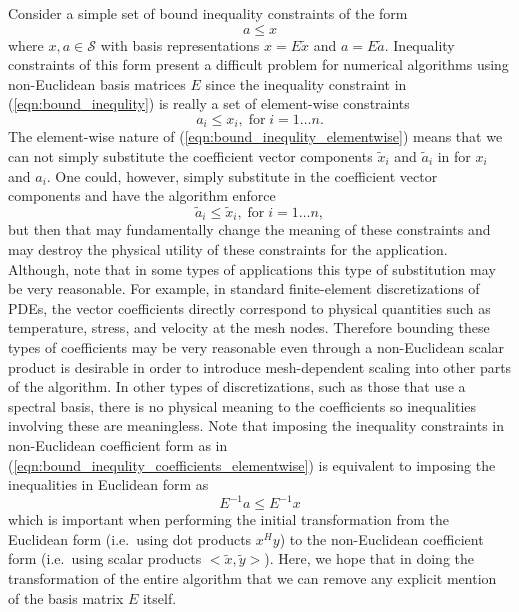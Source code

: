 Consider a simple set of bound inequality constraints of the form
%
\begin{equation}
a \le x
\label{eqn:bound_inequlity}
\end{equation}
%
where $x,a\in\mathcal{S}$ with basis representations $x = E\tilde{x}$ and $a =
E\tilde{a}$.  Inequality constraints of this form present a difficult problem
for numerical algorithms using non-Euclidean basis matrices $E$ since the
inequality constraint in (\ref{eqn:bound_inequlity}) is really a set of
element-wise constraints
%
\begin{equation}
a_i \le x_i , \; \mbox{for} \; i=1 \ldots n.
\label{eqn:bound_inequlity_elementwise}
\end{equation}
%
The element-wise nature of (\ref{eqn:bound_inequlity_elementwise}) means that
we can not simply substitute the coefficient vector components $\tilde{x}_i$
and $\tilde{a}_i$ in for $x_i$ and $a_i$.  One could, however, simply
substitute in the coefficient vector components and have the algorithm enforce
%
\begin{equation}
\tilde{a}_i \le \tilde{x}_i , \; \mbox{for} \; i=1 \ldots n,
\label{eqn:bound_inequlity_coefficients_elementwise}
\end{equation}
%
but then that may fundamentally change the meaning of these constraints and
may destroy the physical utility of these constraints for the application.
Although, note that in some types of applications this type of substitution
may be very reasonable.  For example, in standard finite-element
discretizations of PDEs, the vector coefficients directly correspond to
physical quantities such as temperature, stress, and velocity at the mesh
nodes.  Therefore bounding these types of coefficients may be very reasonable
even through a non-Euclidean scalar product is desirable in order to introduce
mesh-dependent scaling into other parts of the algorithm.  In other types of
discretizations, such as those that use a spectral basis, there is no physical
meaning to the coefficients so inequalities involving these are meaningless.
Note that imposing the inequality constraints in non-Euclidean coefficient
form as in (\ref{eqn:bound_inequlity_coefficients_elementwise}) is equivalent
to imposing the inequalities in Euclidean form as
%
\begin{equation}
E^{-1} a \le E^{-1} x
\label{eqn:bound_inequlity_with_basis_inverses}
\end{equation}
%
which is important when performing the initial transformation from the
Euclidean form (i.e.\ using dot products $x^H y$) to the non-Euclidean
coefficient form (i.e.\ using scalar products $<\tilde{x},\tilde{y}>$).  Here,
we hope that in doing the transformation of the entire algorithm that we can
remove any explicit mention of the basis matrix $E$ itself.


